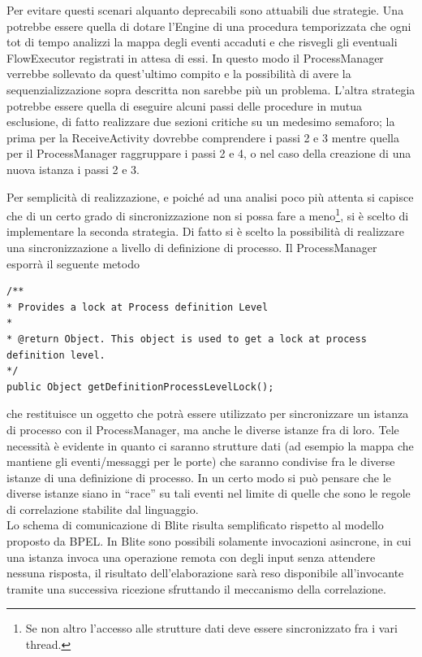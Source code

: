 Per evitare questi scenari alquanto deprecabili sono attuabili due strategie.
Una potrebbe essere quella di dotare l'Engine di una procedura temporizzata che
ogni tot di tempo analizzi la mappa degli eventi accaduti e che risvegli
gli eventuali FlowExecutor registrati in attesa di essi. In questo modo il
ProcessManager verrebbe sollevato da quest'ultimo compito e la possibilità di
avere la sequenzializzazione sopra descritta non sarebbe più un problema.
L'altra strategia potrebbe essere quella di eseguire alcuni passi delle
procedure in mutua esclusione, di fatto realizzare due sezioni critiche su un
medesimo semaforo; la prima per la ReceiveActivity dovrebbe comprendere i passi
2 e 3 mentre quella per il ProcessManager raggruppare i passi 2 e 4, o nel caso
della creazione di una nuova istanza i passi 2 e 3.

Per semplicità di realizzazione, e poiché ad una analisi poco più attenta si
capisce che di un certo grado di sincronizzazione non si possa fare a meno\footnote{Se
non altro l'accesso alle strutture dati deve essere sincronizzato fra i vari
thread.}, si \`e scelto di implementare la seconda strategia. Di fatto si \`e
scelto la possibilità di realizzare una sincronizzazione a livello di
definizione di processo. Il ProcessManager esporrà il seguente metodo

\begin{lstlisting}
/**
* Provides a lock at Process definition Level
* 
* @return Object. This object is used to get a lock at process definition level.
*/
public Object getDefinitionProcessLevelLock();
\end{lstlisting}

che restituisce un oggetto che potrà essere utilizzato per sincronizzare un
istanza di processo con il ProcessManager, ma anche le diverse istanze fra di
loro. Tele necessità \`e evidente in quanto ci saranno strutture dati (ad
esempio la mappa che mantiene gli eventi/messaggi per le porte) che saranno
condivise fra le diverse istanze di una definizione di processo. In un certo
modo si può pensare che le diverse istanze siano in ``race'' su tali eventi
nel limite di quelle che sono le regole di correlazione stabilite dal
linguaggio.
\\

Lo schema di comunicazione di Blite risulta semplificato rispetto al modello
proposto da BPEL. In Blite sono possibili solamente invocazioni asincrone, in
cui una istanza invoca una operazione remota con degli input senza attendere
nessuna risposta, il risultato dell'elaborazione sarà reso disponibile
all'invocante tramite una successiva ricezione sfruttando il meccanismo della
correlazione. 

